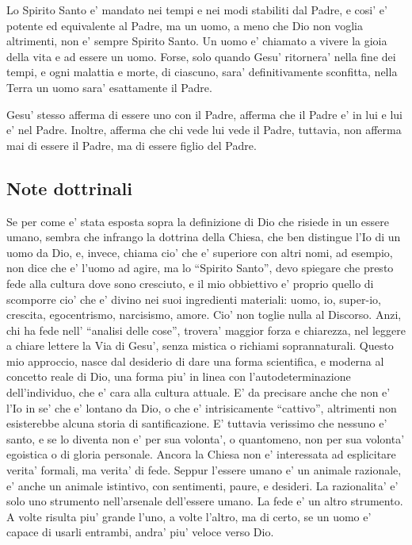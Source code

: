 Lo Spirito Santo e' mandato nei tempi e nei modi stabiliti dal Padre, e cosi' e' potente ed equivalente al Padre, ma un uomo, a meno che Dio non voglia altrimenti, non e' sempre Spirito Santo. Un uomo e' chiamato a vivere la gioia della vita e ad essere un uomo. Forse, solo quando Gesu' ritornera' nella fine dei tempi, e ogni malattia e morte, di ciascuno, sara' definitivamente sconfitta, nella Terra un uomo sara' esattamente il Padre.

Gesu' stesso afferma di essere uno con il Padre, afferma che il Padre e' in lui e lui e' nel Padre. Inoltre, afferma che chi vede lui vede il Padre, tuttavia, non afferma mai di essere il Padre, ma di essere figlio del Padre.

\subsection{Note dottrinali}
Se per come e' stata esposta sopra la definizione di Dio che risiede in un essere umano, sembra che infrango la dottrina della Chiesa, che ben distingue l'Io di un uomo da Dio, e, invece, chiama cio' che e' superiore con altri nomi, ad esempio, non dice che e' l'uomo ad agire, ma lo ``Spirito Santo'', devo spiegare che presto fede alla cultura dove sono cresciuto, e il mio obbiettivo e' proprio quello di scomporre cio' che e' divino nei suoi ingredienti materiali: uomo, io, super-io, crescita, egocentrismo, narcisismo, amore. 
Cio' non toglie nulla al Discorso. Anzi, chi ha fede nell' ``analisi delle cose'', trovera' maggior forza e chiarezza, nel leggere a chiare lettere la Via di Gesu', senza mistica o richiami soprannaturali. Questo mio approccio, nasce dal desiderio di dare una forma scientifica, e moderna al concetto reale di Dio, una forma piu' in linea con l'autodeterminazione dell'individuo, che e' cara alla cultura attuale. E' da precisare anche che non e' l'Io in se' che e' lontano da Dio, o che e' intrisicamente ``cattivo'', altrimenti non esisterebbe alcuna storia di santificazione.
E' tuttavia verissimo che nessuno e' santo, e se lo diventa non e' per sua volonta', o quantomeno, non per sua volonta' egoistica o di gloria personale.
Ancora la Chiesa non e' interessata ad esplicitare verita' formali, ma verita' di fede. Seppur l'essere umano e' un animale razionale, e' anche un animale istintivo, con sentimenti, paure, e desideri. La razionalita' e' solo uno strumento nell'arsenale dell'essere umano. La fede e' un altro strumento. A volte risulta piu' grande l'uno, a volte l'altro, ma di certo, se un uomo e' capace di usarli entrambi, andra' piu' veloce verso Dio.\\
